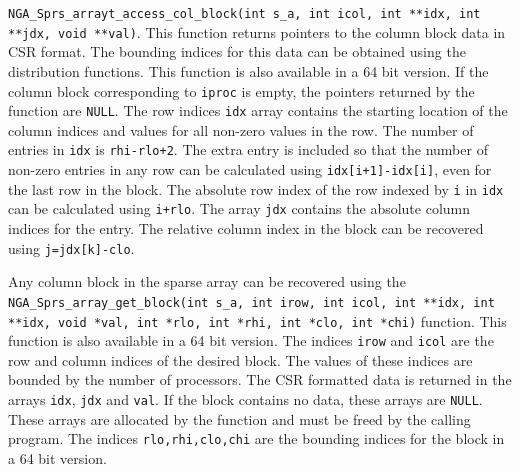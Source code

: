 \texttt{NGA\_Sprs\_arrayt\_access\_col\_block(int s\_a, int icol, int **idx, int
**jdx, void **val)}. \newline
This function returns pointers to the column block data in
CSR format. The bounding indices for this data can be obtained using the
distribution functions. This function is also available in a 64 bit version. If
the column block corresponding to \texttt{iproc} is empty, the pointers returned
by the function are \texttt{NULL}. The
row indices \texttt{idx} array contains the starting location of the column
indices and values for all non-zero values in the row. The number of entries in
\texttt{idx} is \texttt{rhi-rlo+2}. The extra entry is included so that
the number of non-zero entries in any row can be calculated using
\texttt{idx[i+1]-idx[i]}, even for the last row in the block. The absolute row
index of the row indexed by \texttt{i} in \texttt{idx} can be calculated using
\texttt{i+rlo}. The array \texttt{jdx} contains the absolute column indices for
the entry. The relative column index in the block can be recovered using
\texttt{j=jdx[k]-clo}.

Any column block in the sparse array can be recovered using the \newline
\texttt{NGA\_Sprs\_array\_get\_block(int s\_a, int irow, int icol, int **idx,
int **idx, void *val, int *rlo, int *rhi, int *clo, int *chi)} function. This
function is also available in a 64 bit version. The indices \texttt{irow} and
\texttt{icol} are the row and column indices of the desired block. The values of
these indices are bounded by the number of processors. The CSR formatted data is
returned in the arrays \texttt{idx}, \texttt{jdx} and \texttt{val}. If the block
contains no data, these arrays are \texttt{NULL}. These arrays
are allocated by the function and must be freed by the calling program. The
indices \texttt{rlo,rhi,clo,chi} are the bounding indices for the block
in a 64 bit version. 
